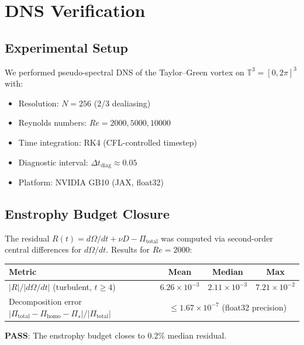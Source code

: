 \documentclass[12pt,a4paper]{article}
\theoremstyle{definition}
\newcommand{\T}{\mathbb{T}}
\begin{document}
\section{DNS Verification}\label{sec:DNS}

\subsection{Experimental Setup}

We performed pseudo-spectral DNS of the Taylor--Green vortex on $\T^3 = [0, 2\pi]^3$ with:
\begin{itemize}
  \item Resolution: $N = 256$ (2/3 dealiasing)
  \item Reynolds numbers: $Re = 2000, 5000, 10000$
  \item Time integration: RK4 (CFL-controlled timestep)
  \item Diagnostic interval: $\Delta t_{\mathrm{diag}} \approx 0.05$
  \item Platform: NVIDIA GB10 (JAX, float32)
\end{itemize}

\subsection{Enstrophy Budget Closure}

The residual $R(t) = d\Omega/dt + \nu D - \Pi_{\mathrm{total}}$ was computed via second-order central differences for $d\Omega/dt$. Results for $Re = 2000$:

\begin{center}
\begin{tabular}{lccc}
\toprule
\textbf{Metric} & \textbf{Mean} & \textbf{Median} & \textbf{Max} \\
\midrule
$|R|/|d\Omega/dt|$ (turbulent, $t \geq 4$) & $6.26 \times 10^{-3}$ & $2.11 \times 10^{-3}$ & $7.21 \times 10^{-2}$ \\
Decomposition error $|\Pi_{\mathrm{total}} - \Pi_{\mathrm{homo}} - \Pi_s|/|\Pi_{\mathrm{total}}|$ & \multicolumn{3}{c}{$\leq 1.67 \times 10^{-7}$ (float32 precision)} \\
\bottomrule
\end{tabular}
\end{center}

\textbf{PASS}: The enstrophy budget closes to $0.2\%$ median residual.
\end{document}
